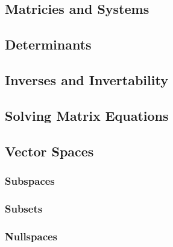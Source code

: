 \documentclass[../Math_Notes.tex]{subfiles}
\begin{document}
\subsection{Matricies and Systems}
\subsection{Determinants}
\subsection{Inverses and Invertability}
\subsection{Solving Matrix Equations}
\subsection{Vector Spaces}
\subsubsection{Subspaces}
\subsubsection{Subsets}
\subsubsection{Nullspaces}
\end{document}
